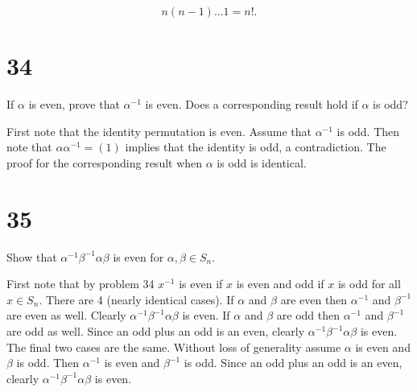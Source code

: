 \documentclass[a4paper]{article}
\begin{document}
$$n(n-1)...1 = n!.$$


\section*{34}

If $\alpha$ is even, prove that $\alpha^{-1}$ is even. Does a corresponding result hold if $\alpha$ is odd?

\vspace{\baselineskip}

First note that the identity permutation is even. Assume that $\alpha^{-1}$ is odd. Then note that $\alpha \alpha^{-1} = (1)$ implies that the identity is odd, a contradiction. The proof for the corresponding result when $\alpha$ is odd is identical.


\section*{35}

Show that $\alpha^{-1} \beta^{-1} \alpha \beta$ is even for $\alpha, \beta \in S_n$.

\vspace{\baselineskip}

First note that by problem 34 $x^{-1}$ is even if $x$ is even and odd if $x$ is odd for all $x \in S_n$. There are 4 (nearly identical cases). If $\alpha$ and $\beta$ are even then $\alpha^{-1}$ and $\beta^{-1}$ are even as well. Clearly $\alpha^{-1} \beta^{-1} \alpha \beta$ is even. If $\alpha$ and $\beta$ are odd then $\alpha^{-1}$ and $\beta^{-1}$ are odd as well. Since an odd plus an odd is an even, clearly $\alpha^{-1} \beta^{-1} \alpha \beta$ is even. The final two cases are the same. Without loss of generality assume $\alpha$ is even and $\beta$ is odd. Then $\alpha^{-1}$ is even and $\beta^{-1}$ is odd. Since an odd plus an odd is an even, clearly $\alpha^{-1} \beta^{-1} \alpha \beta$ is even.
\end{document}
